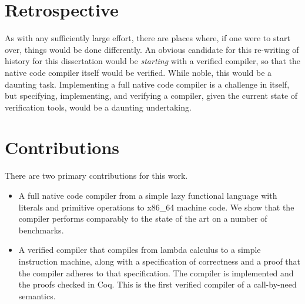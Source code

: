 \section{Retrospective}

As with any sufficiently large effort, there are places where, if one were to
start over, things would be done differently. An obvious candidate for this
re-writing of history for this dissertation would be \emph{starting} with a
verified compiler, so that the native code compiler itself would be verified.
While noble, this would be a daunting task. Implementing a full native code
compiler is a challenge in itself, but specifying, implementing, and verifying a
compiler, given the current state of verification tools, would be a daunting
undertaking. 

\section{Contributions}

There are two primary contributions for this work. 

\begin{itemize}
\item A full native code compiler from a simple lazy functional language with
literals and primitive operations to x86\_64 machine code. We show that the
compiler performs comparably to the state of the art on a number of benchmarks. 

\item A verified compiler that compiles from lambda calculus to a simple
instruction machine, along with a specification of correctness and a proof that
the compiler adheres to that specification. The compiler is implemented and the
proofs checked in Coq. This is the first verified compiler of a call-by-need
semantics. 
\end{itemize}

